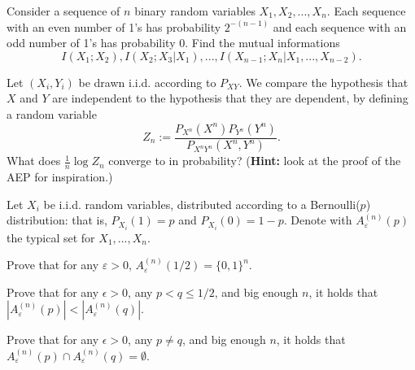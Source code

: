\documentclass[a4paper,10pt,landscape,twocolumn]{scrartcl}
\begin{document}
\begin{exercise}
Consider a sequence of $n$ binary random variables $X_1, X_2, ..., X_n$.
Each sequence with an even number of 1's has probability $2^{-(n-1)}$ and each sequence with an odd number
of 1's has probability 0. Find the mutual informations
\[
I(X_1;X_2), I(X_2;X_3|X_1), ..., I(X_{n-1};X_n|X_1, ..., X_{n-2}).
\]
\end{exercise}
\vspace{-0.5cm}

\begin{exercise}[Independence?]
	Let $(X_i,Y_i)$ be drawn i.i.d. according to $P_{XY}$. We compare the hypothesis that $X$ and $Y$ are independent to the hypothesis that they are dependent, by defining a random variable
	\[
	Z_n := \frac{P_{X^n}({X^n})P_{Y^n}(Y^n)}{P_{X^nY^n}(X^n,Y^n)}.
	\]
	What does $\frac{1}{n} \log Z_n$ converge to in probability? (\textbf{Hint:} look at the proof of the AEP for inspiration.)
\end{exercise}

\begin{exercise}
	Let $X_i$ be i.i.d. random variables, distributed according to a Bernoulli($p$) distribution: that is, $P_{X_i}(1) = p$ and $P_{X_i}(0) = 1-p$. Denote with $A_{\varepsilon}^{(n)}(p)$ the typical set for $X_1, ..., X_n$.
	
	\begin{subex}
		Prove that for any $\varepsilon > 0$, $A_{\varepsilon}^{(n)}(1/2) = \{0,1\}^n$.
	\end{subex}
	\begin{subex}
		Prove that for any $\epsilon > 0$, any $p < q \leq 1/2$, and big enough $n$, it holds that $|A_{\varepsilon}^{(n)}(p)| < |A_{\varepsilon}^{(n)}(q)|$.
	\end{subex}
\begin{subex}
	Prove that for any $\epsilon > 0$, any $p \neq q$, and big enough $n$, it holds that $A_{\varepsilon}^{(n)}(p) \cap A_{\varepsilon}^{(n)}(q) = \emptyset$.
\end{subex}
\end{exercise}
\end{document}

